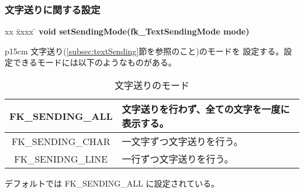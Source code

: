 \subsubsection{文字送りに関する設定} \label{subsubsec:sendRef}
\begin{tabbing}
xx \= xxxx \= \kill
\> \textbf{void setSendingMode(fk\_TextSendingMode mode)} \\
	\> \> \begin{tabular}{p{15cm}}
		文字送り(\ref{subsec:textSending}節を参照のこと)のモードを
		設定する。設定できるモードには以下のようなものがある。
			\begin{table}[H]
			\caption{文字送りのモード}
			\label{tbl:textSending}
			\begin{center}
			\begin{tabular}{|c|l|}
			\hline
			FK\_SENDING\_ALL &
			文字送りを行わず、全ての文字を一度に表示する。
			\\ \hline
			FK\_SENDING\_CHAR &
			一文字ずつ文字送りを行う。\\ \hline
			FK\_SENIDNG\_LINE &
			一行ずつ文字送りを行う。\\ \hline
			\end{tabular}
			\end{center}
			\end{table}
		デフォルトでは FK\_SENDING\_ALL に設定されている。
	\end{tabular}
\end{tabbing}

